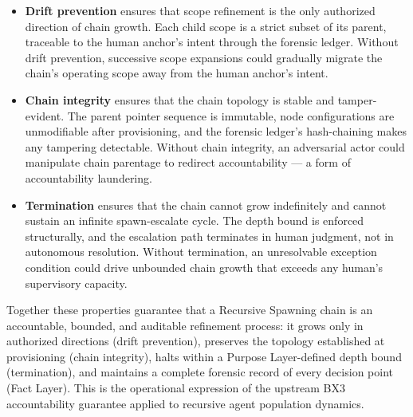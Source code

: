 \begin{itemize}
\item \textbf{Drift prevention} ensures that scope refinement is the only authorized direction of chain growth. Each child scope is a strict subset of its parent, traceable to the human anchor's intent through the forensic ledger. Without drift prevention, successive scope expansions could gradually migrate the chain's operating scope away from the human anchor's intent.
\item \textbf{Chain integrity} ensures that the chain topology is stable and tamper-evident. The parent pointer sequence is immutable, node configurations are unmodifiable after provisioning, and the forensic ledger's hash-chaining makes any tampering detectable. Without chain integrity, an adversarial actor could manipulate chain parentage to redirect accountability — a form of accountability laundering.
\item \textbf{Termination} ensures that the chain cannot grow indefinitely and cannot sustain an infinite spawn-escalate cycle. The depth bound is enforced structurally, and the escalation path terminates in human judgment, not in autonomous resolution. Without termination, an unresolvable exception condition could drive unbounded chain growth that exceeds any human's supervisory capacity.
\end{itemize}

Together these properties guarantee that a Recursive Spawning chain is an accountable, bounded, and auditable refinement process: it grows only in authorized directions (drift prevention), preserves the topology established at provisioning (chain integrity), halts within a Purpose Layer-defined depth bound (termination), and maintains a complete forensic record of every decision point (Fact Layer). This is the operational expression of the upstream BX3 accountability guarantee applied to recursive agent population dynamics.